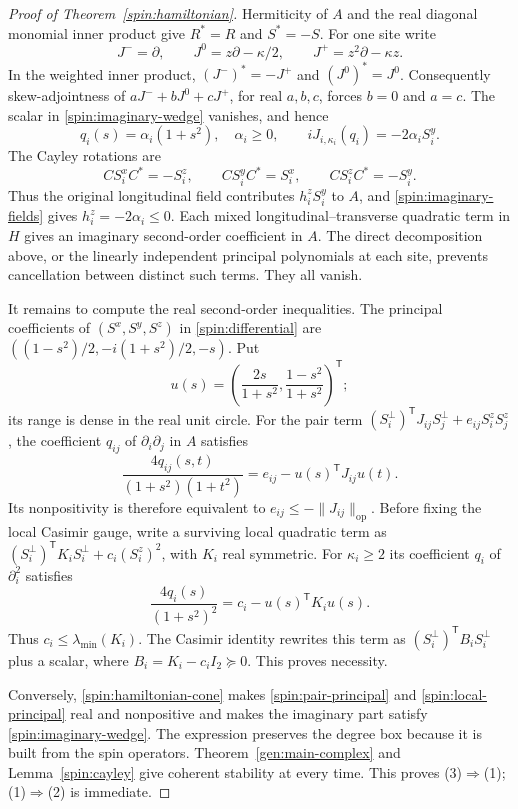 \documentclass[reqno]{amsart}
\theoremstyle{definition}
\theoremstyle{remark}
\begin{document}
\begin{proof}[Proof of Theorem~\ref{spin:hamiltonian}]
Hermiticity of $A$ and the real diagonal monomial inner product give
$R^*=R$ and $S^*=-S$.  For one site write
\[
 J^-=\partial,\qquad J^0=z\partial-\kappa/2,\qquad
 J^+=z^2\partial-\kappa z.
\]
In the weighted inner product,
$(J^-)^*=-J^+$ and $(J^0)^*=J^0$.
Consequently skew-adjointness of
$aJ^-+bJ^0+cJ^+$, for real $a,b,c$, forces $b=0$ and $a=c$.
The scalar in \eqref{spin:imaginary-wedge} vanishes, and hence
\begin{equation}\label{spin:imaginary-fields}
 q_i(s)=\alpha_i(1+s^2),\quad\alpha_i\geq0,
 \qquad iJ_{i,\kappa_i}(q_i)=-2\alpha_iS_i^y.
\end{equation}
The Cayley rotations are
\begin{equation}\label{spin:rotation}
 CS_i^xC^*=-S_i^z,\qquad CS_i^yC^*=S_i^x,\qquad
 CS_i^zC^*=-S_i^y.
\end{equation}
Thus the original longitudinal field contributes $h_i^zS_i^y$ to $A$,
and \eqref{spin:imaginary-fields} gives $h_i^z=-2\alpha_i\leq0$.
Each mixed longitudinal--transverse quadratic term in $H$ gives an
imaginary second-order coefficient in $A$.  The direct decomposition
above, or the linearly independent principal polynomials at each site,
prevents cancellation between distinct such terms.  They all vanish.

It remains to compute the real second-order inequalities.  The principal
coefficients of $(S^x,S^y,S^z)$ in \eqref{spin:differential} are
$((1-s^2)/2,-i(1+s^2)/2,-s)$.  Put
\[
 u(s)=\left(\frac{2s}{1+s^2},\frac{1-s^2}{1+s^2}\right)^{\mathsf T};
\]
its range is dense in the real unit circle.  For the pair term
$(S_i^\perp)^{\mathsf T}J_{ij}S_j^\perp+e_{ij}S_i^zS_j^z$,
the coefficient $q_{ij}$ of $\partial_i\partial_j$ in $A$ satisfies
\begin{equation}\label{spin:pair-principal}
 \frac{4q_{ij}(s,t)}{(1+s^2)(1+t^2)}
       =e_{ij}-u(s)^{\mathsf T}J_{ij}u(t).
\end{equation}
Its nonpositivity is therefore equivalent to
$e_{ij}\leq-\|J_{ij}\|_{\mathrm{op}}$.
Before fixing the local Casimir gauge, write a surviving local quadratic
term as $(S_i^\perp)^{\mathsf T}K_iS_i^\perp+c_i(S_i^z)^2$, with
$K_i$ real symmetric.  For $\kappa_i\geq2$ its coefficient $q_i$ of
$\partial_i^2$ satisfies
\begin{equation}\label{spin:local-principal}
 \frac{4q_i(s)}{(1+s^2)^2}=c_i-u(s)^{\mathsf T}K_iu(s).
\end{equation}
Thus $c_i\leq\lambda_{\min}(K_i)$.  The Casimir identity rewrites this
term as $(S_i^\perp)^{\mathsf T}B_iS_i^\perp$ plus a scalar, where
$B_i=K_i-c_iI_2\succeq0$.  This proves necessity.

Conversely, \eqref{spin:hamiltonian-cone} makes
\eqref{spin:pair-principal} and \eqref{spin:local-principal} real and
nonpositive and makes the imaginary part satisfy
\eqref{spin:imaginary-wedge}.  The expression preserves the degree box
because it is built from the spin operators.
Theorem~\ref{gen:main-complex} and Lemma~\ref{spin:cayley} give coherent stability at
every time.  This proves (3)$\Rightarrow$(1); (1)$\Rightarrow$(2) is
immediate.
\end{proof}
\end{document}
